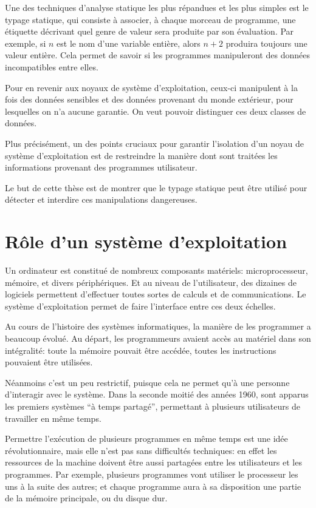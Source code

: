 Une des techniques d'analyse statique les plus répandues et les plus simples est
le typage statique, qui consiste à associer, à chaque morceau de programme, une
étiquette décrivant quel genre de valeur sera produite par son évaluation. Par
exemple, si $n$ est le nom d'une variable entière, alors $n + 2$ produira
toujours une valeur entière.
Cela permet de savoir si les programmes manipuleront des données incompatibles
entre elles.

Pour en revenir aux noyaux de système d'exploitation, ceux-ci manipulent à la
fois des données sensibles et des données provenant du monde extérieur, pour
lesquelles on n'a aucune garantie. On veut pouvoir distinguer ces deux classes
de données.

Plus précisément, un des points cruciaux pour garantir l'isolation d'un noyau de
système d'exploitation est de restreindre la manière dont sont traitées les
informations provenant des programmes utilisateur.


Le but de cette thèse est de montrer que le typage statique peut être utilisé
pour détecter et interdire ces manipulations dangereuses.

\section{Rôle d'un système d'exploitation}

Un ordinateur est constitué de nombreux composants matériels: microprocesseur,
mémoire, et divers périphériques. Et au niveau de l'utilisateur, des dizaines de
logiciels permettent d'effectuer toutes sortes de calculs et de communications.
Le système d'exploitation permet de faire l'interface entre ces deux échelles.

Au cours de l'histoire des systèmes informatiques, la manière de les programmer
a beaucoup évolué. Au départ, les programmeurs avaient accès au matériel dans
son intégralité: toute la mémoire pouvait être accédée, toutes les instructions
pouvaient être utilisées.

Néanmoins c'est un peu restrictif, puisque cela ne permet qu'à une personne
d'interagir avec le système. Dans la seconde moitié des années 1960, sont
apparus les premiers systèmes \enquote{à temps partagé}, permettant à plusieurs
utilisateurs de travailler en même temps.

Permettre l'exécution de plusieurs programmes en même temps est une idée
révolutionnaire, mais elle n'est pas sans difficultés techniques: en effet les
ressources de la machine doivent être aussi partagées entre les utilisateurs et
les programmes. Par exemple, plusieurs programmes vont utiliser le processeur
les uns à la suite des autres; et chaque programme aura à sa disposition une
partie de la mémoire principale, ou du disque dur.

